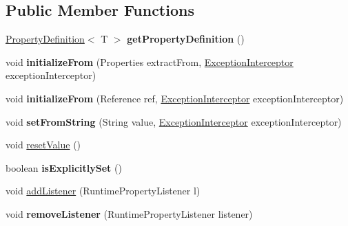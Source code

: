 \subsection*{Public Member Functions}
\begin{DoxyCompactItemize}
\item 
\mbox{\label{classcom_1_1mysql_1_1cj_1_1conf_1_1_abstract_runtime_property_a7b2a2a91db076eac215a0dad7e658515}} 
\mbox{\hyperlink{interfacecom_1_1mysql_1_1cj_1_1conf_1_1_property_definition}{Property\+Definition}}$<$ T $>$ {\bfseries get\+Property\+Definition} ()
\item 
\mbox{\label{classcom_1_1mysql_1_1cj_1_1conf_1_1_abstract_runtime_property_aa821d8b742dfb3c658972f11f57ad02c}} 
void {\bfseries initialize\+From} (Properties extract\+From, \mbox{\hyperlink{interfacecom_1_1mysql_1_1cj_1_1exceptions_1_1_exception_interceptor}{Exception\+Interceptor}} exception\+Interceptor)
\item 
\mbox{\label{classcom_1_1mysql_1_1cj_1_1conf_1_1_abstract_runtime_property_ad1d2dcce52a6e6284cebb20fbf9729db}} 
void {\bfseries initialize\+From} (Reference ref, \mbox{\hyperlink{interfacecom_1_1mysql_1_1cj_1_1exceptions_1_1_exception_interceptor}{Exception\+Interceptor}} exception\+Interceptor)
\item 
\mbox{\label{classcom_1_1mysql_1_1cj_1_1conf_1_1_abstract_runtime_property_a06e57f3969b0cacb8b4e58888c79c18f}} 
void {\bfseries set\+From\+String} (String value, \mbox{\hyperlink{interfacecom_1_1mysql_1_1cj_1_1exceptions_1_1_exception_interceptor}{Exception\+Interceptor}} exception\+Interceptor)
\item 
void \mbox{\hyperlink{classcom_1_1mysql_1_1cj_1_1conf_1_1_abstract_runtime_property_af8d93196b5571652a430ae751df642f9}{reset\+Value}} ()
\item 
\mbox{\label{classcom_1_1mysql_1_1cj_1_1conf_1_1_abstract_runtime_property_addb0599475473228acd97cfd1087d693}} 
boolean {\bfseries is\+Explicitly\+Set} ()
\item 
void \mbox{\hyperlink{classcom_1_1mysql_1_1cj_1_1conf_1_1_abstract_runtime_property_ac64a41d2f3d03d32b3252b0747cdf030}{add\+Listener}} (Runtime\+Property\+Listener l)
\item 
\mbox{\label{classcom_1_1mysql_1_1cj_1_1conf_1_1_abstract_runtime_property_a2c639b0ccaeee9e568efefe136a0c073}} 
void {\bfseries remove\+Listener} (Runtime\+Property\+Listener listener)
\end{DoxyCompactItemize}
